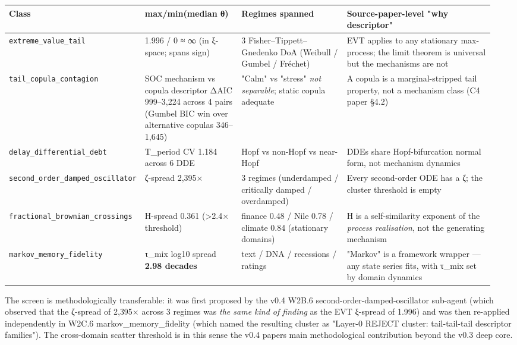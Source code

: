 \documentclass[
  11pt]{article}
\newcounter{none} %
\begin{document}
{\def\LTcaptype{none} %
\begin{longtable}[]{@{}p{0.22\linewidth}p{0.20\linewidth}p{0.22\linewidth}p{0.31\linewidth}@{}}
\toprule\noalign{}
Class & max/min(median θ) & Regimes spanned & Source-paper-level "why descriptor" \\
\midrule\noalign{}
\endhead
\bottomrule\noalign{}
\endlastfoot
\texttt{extreme\_value\_tail} & 1.996 / 0 ≈ ∞ (in ξ-space; spans sign) & 3 Fisher--Tippett--Gnedenko DoA (Weibull / Gumbel / Fréchet) & EVT applies to any stationary max-process; the limit theorem is universal but the mechanisms are not \\
\texttt{tail\_copula\_contagion} & SOC mechanism vs copula descriptor ΔAIC 999--3{,}224 across 4 pairs (Gumbel BIC win over alternative copulas 346--1{,}645) & "Calm" vs "stress" \emph{not separable}; static copula adequate & A copula is a marginal-stripped tail property, not a mechanism class (C4 paper §4.2) \\
\texttt{delay\_differential\_debt} & T\_period CV 1.184 across 6 DDE & Hopf vs non-Hopf vs near-Hopf & DDEs share Hopf-bifurcation normal form, not mechanism dynamics \\
\texttt{second\_order\_damped\_oscillator} & ζ-spread 2{,}395× & 3 regimes (underdamped / critically damped / overdamped) & Every second-order ODE has a ζ; the cluster threshold is empty \\
\texttt{fractional\_brownian\_crossings} & H-spread 0.361 (>2.4× threshold) & finance 0.48 / Nile 0.78 / climate 0.84 (stationary domains) & H is a self-similarity exponent of the \emph{process realisation}, not the generating mechanism \\
\texttt{markov\_memory\_fidelity} & τ\_mix log10 spread \textbf{2.98 decades} & text / DNA / recessions / ratings & "Markov" is a framework wrapper --- any state series fits, with τ\_mix set by domain dynamics \\
\end{longtable}
}

The screen is methodologically transferable: it was first proposed by
the v0.4 W2B.6 second-order-damped-oscillator sub-agent (which observed
that the ζ-spread of 2{,}395× across 3 regimes was \emph{the same kind
of finding} as the EVT ξ-spread of 1.996) and was then re-applied
independently in W2C.6 markov\_memory\_fidelity (which named the
resulting cluster as "Layer-0 REJECT cluster: tail-tail-tail descriptor
families"). The cross-domain scatter threshold is in this sense the
v0.4 paper\textquotesingle s main methodological contribution beyond the
v0.3 deep core.
\end{document}

